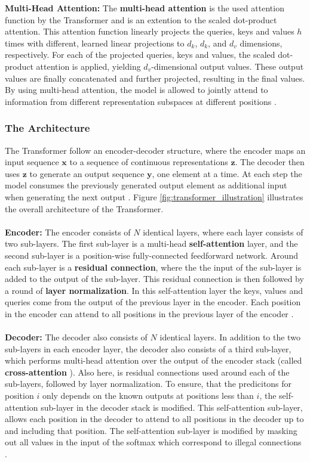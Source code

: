 \documentclass[./main.tex]{subfiles}
\begin{document}
\textbf{Multi-Head Attention:} The \textbf{multi-head attention} is the used attention function by the Transformer and is an extention to the scaled dot-product attention. This attention function linearly projects the queries, keys and values $h$ times with different, learned linear projections to $d_k$, $d_k$, and $d_v$ dimensions, respectively. For each of the projected queries, keys and values, the scaled dot-product attention is applied, yielding $d_v$-dimensional output values. These output values are finally concatenated and further projected, resulting in the final values. By using multi-head attention, the model is allowed to jointly attend to information from different representation subspaces at different positions \cite{https://doi.org/10.48550/arxiv.1706.03762}.

\subsubsection{The Architecture}
The Transformer follow an encoder-decoder structure, where the encoder maps an input sequence $\bm{x}$ to a sequence of continuous representations $\bm{z}$. The decoder then uses $\bm{z}$ to generate an output sequence $\bm{y}$, one element at a time. At each step the model consumes the previously generated output element as additional input when generating the next output \cite{https://doi.org/10.48550/arxiv.1706.03762}. Figure \ref{fig:transformer_illustration} illustrates the overall architecture of the Transformer.
\\
\\
\noindent \textbf{Encoder:} The encoder consists of $N$ identical layers, where each layer consists of two sub-layers. The first sub-layer is a multi-head \textbf{self-attention} layer, and the second sub-layer is a position-wise fully-connected feedforward network. Around each sub-layer is a \textbf{residual connection}, where the the input of the sub-layer is added to the output of the sub-layer. This residual connection is then followed by a round of \textbf{layer normalization}. In this self-attention layer the keys, values and queries come from the output of the previous layer in the encoder. Each position in the encoder can attend to all positions in the previous layer of the encoder \cite{https://doi.org/10.48550/arxiv.1706.03762}.
\\
\\
\noindent \textbf{Decoder:} The decoder also consists of $N$ identical layers. In addition to the two sub-layers in each encoder layer, the decoder also consists of a third sub-layer, which performs multi-head attention over the output of the encoder stack (called \textbf{cross-attention} \cite{cross_attention}). Also here, is residual connections used around each of the sub-layers, followed by layer normalization. To ensure, that the predicitons for position $i$ only depends on the known outputs at positions less than $i$, the self-attention sub-layer in the decoder stack is modified. This self-attention sub-layer, allows each position in the decoder to attend to all positions in the decoder up to and including that position. The self-attention sub-layer is modified by masking out all values in the input of the softmax which correspond to illegal connections \cite{https://doi.org/10.48550/arxiv.1706.03762}.
\end{document}
